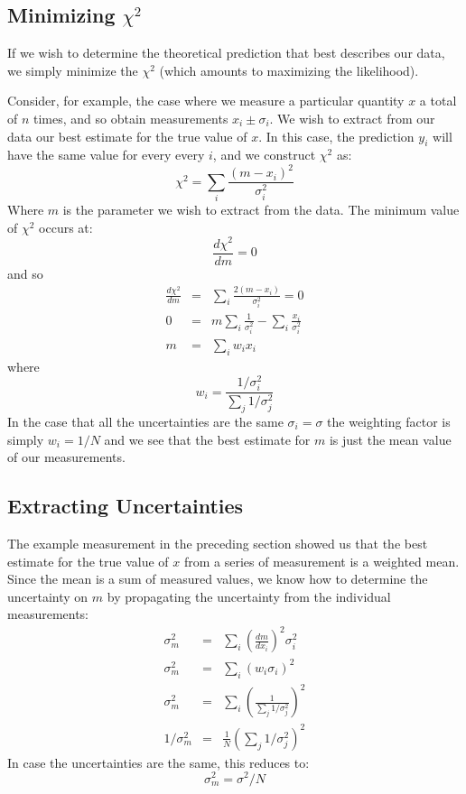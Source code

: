 \documentclass[12pt]{article}
\begin{document}
\subsection{Minimizing $\chi^2$}

If we wish to determine the theoretical prediction that best describes our data, we simply minimize the $\chi^2$ (which amounts to maximizing the likelihood).

Consider, for example, the case where we measure a particular quantity $x$ a total of $n$ times, and so obtain measurements $x_i \pm \sigma_i$.  
We wish to extract from our data our best estimate for the true value of $x$.  In this case, the prediction $y_i$ will have the same value for every every $i$, and we construct $\chi^2$ as:
\begin{displaymath}
\chi^2 = \sum_i \frac{(m - x_i)^2}{\sigma_i^2}
\end{displaymath}
Where $m$ is the parameter we wish to extract from the data.  The minimum value of $\chi^2$ occurs at:
\begin{displaymath}
\frac{d\chi^2}{dm} = 0
\end{displaymath}
and so
\begin{eqnarray*}
\frac{d\chi^2}{dm} &=& \sum_i \frac{2(m - x_i)}{\sigma_i^2} = 0\\
0 &=& m \sum_i \frac{1}{\sigma^2_i} - \sum_i \frac{x_i}{\sigma^2_i}\\
m &=& \sum_i w_i x_i
\end{eqnarray*}
where
\begin{equation}
w_i = \frac{1/\sigma^2_i}{\sum_j 1/\sigma_j^2}
\end{equation}
In the case that all the uncertainties are the same $\sigma_i = \sigma$ the weighting factor is simply $w_i = 1 / N$ and we see that the best estimate for $m$ is just the mean value of our measurements.

\subsection{Extracting Uncertainties}

The example measurement in the preceding section showed us that the best estimate for the true value of $x$ from a series of measurement is a weighted mean.  Since the mean is a sum of measured values, we know how to determine the uncertainty on $m$ by propagating the uncertainty from the individual measurements: 
\begin{eqnarray*}
\sigma^2_m &=& \sum_i \left( \frac{dm}{dx_i} \right)^2 \sigma_i^2\\
\sigma^2_m &=& \sum_i (w_i \sigma_i)^2\\
\sigma^2_m &=& \sum_i \left( \frac{1}{\sum_j 1/\sigma_j^2}\right)^2\\
1/\sigma^2_m &=& \frac{1}{N}\left( \sum_j 1/\sigma_j^2 \right)^2
\end{eqnarray*}
In case the uncertainties are the same, this reduces to:
\begin{displaymath}
\sigma_m^2 = \sigma^2/N
\end{displaymath}
\end{document}
